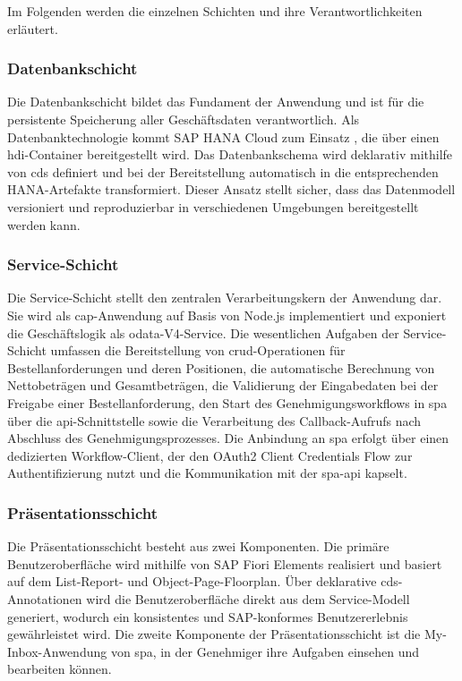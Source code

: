 Im Folgenden werden die einzelnen Schichten und ihre Verantwortlichkeiten erläutert.

\subsubsection{Datenbankschicht}

Die Datenbankschicht bildet das Fundament der Anwendung und ist für die persistente Speicherung aller Geschäftsdaten verantwortlich. Als Datenbanktechnologie kommt SAP HANA Cloud zum Einsatz \citep{sap2024hana}, die über einen \gls{hdi}-Container bereitgestellt wird. Das Datenbankschema wird deklarativ mithilfe von \gls{cds} definiert und bei der Bereitstellung automatisch in die entsprechenden HANA-Artefakte transformiert. Dieser Ansatz stellt sicher, dass das Datenmodell versioniert und reproduzierbar in verschiedenen Umgebungen bereitgestellt werden kann.

\subsubsection{Service-Schicht}

Die Service-Schicht stellt den zentralen Verarbeitungskern der Anwendung dar. Sie wird als \gls{cap}-Anwendung auf Basis von Node.js implementiert und exponiert die Geschäftslogik als \gls{odata}-V4-Service. Die wesentlichen Aufgaben der Service-Schicht umfassen die Bereitstellung von \gls{crud}-Operationen für Bestellanforderungen und deren Positionen, die automatische Berechnung von Nettobeträgen und Gesamtbeträgen, die Validierung der Eingabedaten bei der Freigabe einer Bestellanforderung, den Start des Genehmigungsworkflows in \gls{spa} über die \gls{api}-Schnittstelle sowie die Verarbeitung des Callback-Aufrufs nach Abschluss des Genehmigungsprozesses. Die Anbindung an \gls{spa} erfolgt über einen dedizierten Workflow-Client, der den OAuth2 Client Credentials Flow zur Authentifizierung nutzt und die Kommunikation mit der \gls{spa}-\gls{api} kapselt.

\subsubsection{Präsentationsschicht}

Die Präsentationsschicht besteht aus zwei Komponenten. Die primäre Benutzeroberfläche wird mithilfe von SAP Fiori Elements realisiert und basiert auf dem List-Report- und Object-Page-Floorplan. Über deklarative \gls{cds}-Annotationen wird die Benutzeroberfläche direkt aus dem Service-Modell generiert, wodurch ein konsistentes und SAP-konformes Benutzererlebnis gewährleistet wird. Die zweite Komponente der Präsentationsschicht ist die My-Inbox-Anwendung von \gls{spa}, in der Genehmiger ihre Aufgaben einsehen und bearbeiten können.

